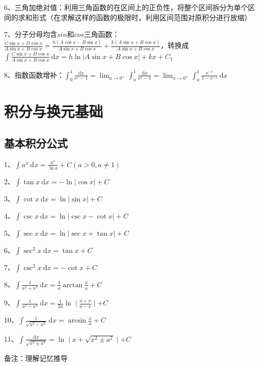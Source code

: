 6、三角加绝对值：利用三角函数的在区间上的正负性，将整个区间拆分为单个区间的求和形式（在求解这样的函数的极限时，利用区间范围对原积分进行放缩）

7、分子分母均含$sin$和$cos$三角函数：$\frac{C \sin x+D \cos x}{A \sin x+B \cos x}=\frac{h(A \cos x-B \sin x)}{A \sin x+B \cos x}+\frac{k(A \sin x+B \cos x)}{A \sin x+B \cos x}$，转换成$\int \frac{C \sin x+D \cos x}{A \sin x+B \cos x} \mathrm{~d} x=h \ln |A \sin x+B \cos x|+k x+C_{1}$

8、指数函数增补：$\int_{0}^{1} \frac{\mathrm{d} x}{\mathrm{e}^{x}-1}=\lim _{a \rightarrow 0^{+}} \int_{a}^{1} \frac{\mathrm{d} x}{\mathrm{e}^{x}-1}=\lim _{a \rightarrow 0^{+}} \int_{a}^{1} \frac{\mathrm{e}^{-x}}{1-\mathrm{e}^{-x}} \mathrm{~d} x$

\section{积分与换元基础}



\subsection{基本积分公式}

1、$\int a^{x} \mathrm{~d} x=\frac{a^{x}}{\ln a}+C(a>0, a \neq 1)$

2、$\int \tan x \mathrm{~d} x=-\ln |\cos x|+C$

3、$\int \cot x \mathrm{~d} x=\ln |\sin x|+C$

4、$\int \csc x \mathrm{~d} x=\ln |\csc x-\cot x|+C$

5、$\int \sec x \mathrm{~d} x=\ln |\sec x+\tan x|+C$

6、$\int \sec ^{2} x \mathrm{~d} x=\tan x+C$

7、$\int \csc ^{2} x \mathrm{~d} x=-\cot x+C$

8、$\int \frac{1}{a^{2}+x^{2}} \mathrm{~d} x=\frac{1}{a} \arctan \frac{x}{a}+C$

9、$\int \frac{1}{a^{2}-x^{2}} \mathrm{~d} x=\frac{1}{2 a} \ln \mid \frac{a+x}{a-x} \mid+C$

10、$\int \frac{1}{\sqrt{a^{2}-x^{2}}} \mathrm{~d} x=\arcsin \frac{x}{a}+C$

11、$\int \frac{\mathrm{d} x}{\sqrt{x^{2} \pm a^{2}}}=\ln \mid x+\sqrt{x^{2} \pm a^{2}} \mid+ C$

备注：理解记忆推导



